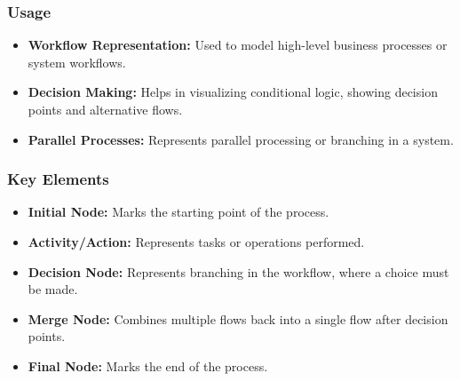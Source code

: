 \subsubsection{Usage}
\begin{itemize}
    \item \textbf{Workflow Representation:} Used to model high-level business processes or system workflows.
    \item \textbf{Decision Making:} Helps in visualizing conditional logic, showing decision points and alternative flows.
    \item \textbf{Parallel Processes:} Represents parallel processing or branching in a system.
\end{itemize}

\subsubsection{Key Elements}
\begin{itemize}
    \item \textbf{Initial Node:} Marks the starting point of the process.
    \item \textbf{Activity/Action:} Represents tasks or operations performed.
    \item \textbf{Decision Node:} Represents branching in the workflow, where a choice must be made.
    \item \textbf{Merge Node:} Combines multiple flows back into a single flow after decision points.
    \item \textbf{Final Node:} Marks the end of the process.
\end{itemize}


